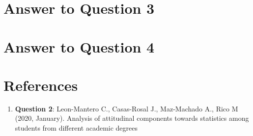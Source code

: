 \documentclass[
	letterpaper, %
]{jdf}
\begin{document}
\section{Answer to Question 3}


\newpage

\section{Answer to Question 4}


\newpage

\section{References}

\printbibliography[heading=none]
\begin{enumerate}
    \item \textbf{Question 2}: \hfill \break
    Leon-Mantero C., Casas-Rosal J., Maz-Machado A., Rico M (2020, January). Analysis of attitudinal components towards statistics among students from different academic degrees
     

\end{enumerate}
\end{document}
